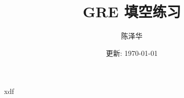 \documentclass{report}
\title{GRE 填空练习}
\author{陈泽华}
\date{更新: \today}
\begin{document}
  \maketitle
  \tableofcontents

  {xdf}
\end{document}
